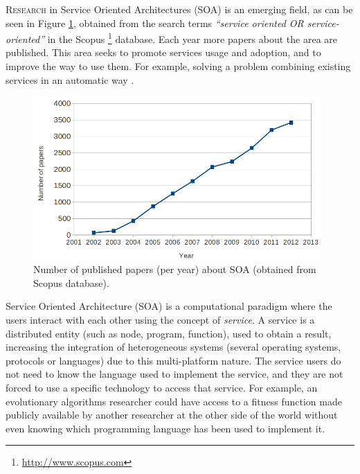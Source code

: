 \label{chap:soa}
\minitoc\mtcskip
\vfill
\lettrine{R}{esearch} in Service Oriented Architectures (SOA) \citep{Papazoglou2007SOA} is an emerging field, as can be seen in Figure \ref{fig:soapapers}, obtained from the search terms {\em ``service oriented OR service-oriented''} in the Scopus \footnote{\url{http://www.scopus.com}} database. Each year more papers about the area are published. This area seeks to promote services usage and adoption, and to improve the way to use them. For example, solving a problem combining existing services in an automatic way \citep{COMPOSITION}.





\begin{figure}
\centering
\includegraphics[width=26pc]{gfx/soa/papersYear.jpg}
\caption{Number of published papers (per year) about SOA (obtained from Scopus database).}
\label{fig:soapapers}
\end{figure}


Service Oriented Architecture (SOA) is a computational
paradigm where the users interact with each other using the concept of
{\em service}. A service is a distributed entity (such as node, program,
function), used to obtain a result, increasing the integration of heterogeneous
systems (several operating systems, protocols or languages) due to
this multi-platform nature. The service users do not need to know
the language used to implement the service, and they are not
forced to use a specific technology to access that service. For
example, an evolutionary algorithms researcher could have access to a
fitness function made publicly available by another researcher at the
other side of the world without even knowing which programming language
has been used to implement it.


